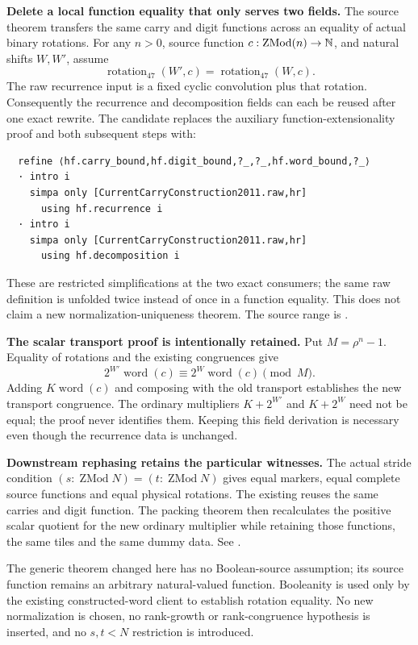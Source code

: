\textbf{Delete a local function equality that only serves two fields.} The source theorem  transfers the same carry and digit functions across an equality of actual binary rotations. For any $n>0$, source function $c:\operatorname{ZMod}(n)\to\mathbb N$, and natural shifts $W,W'$, assume
\[
 \operatorname{rotation}_{47}(W',c)=\operatorname{rotation}_{47}(W,c).
\]
The raw recurrence input is a fixed cyclic convolution plus that rotation. Consequently the recurrence and decomposition fields can each be reused after one exact rewrite. The candidate replaces the auxiliary function-extensionality proof and both subsequent  steps with:
\begin{lstlisting}
  refine ⟨hf.carry_bound,hf.digit_bound,?_,?_,hf.word_bound,?_⟩
  · intro i
    simpa only [CurrentCarryConstruction2011.raw,hr]
      using hf.recurrence i
  · intro i
    simpa only [CurrentCarryConstruction2011.raw,hr]
      using hf.decomposition i
\end{lstlisting}
These are restricted simplifications at the two exact consumers; the same raw definition is unfolded twice instead of once in a function equality. This does not claim a new normalization-uniqueness theorem. The source range is .

\textbf{The scalar transport proof is intentionally retained.} Put $M=\rho^n-1$. Equality of rotations and the existing  congruences give
\[
 2^{W'}\operatorname{word}(c)\equiv2^W\operatorname{word}(c)\pmod M.
\]
Adding $K\operatorname{word}(c)$ and composing with the old transport establishes the new transport congruence. The ordinary multipliers $K+2^{W'}$ and $K+2^W$ need not be equal; the proof never identifies them. Keeping this field derivation is necessary even though the recurrence data is unchanged.

\textbf{Downstream rephasing retains the particular witnesses.} The actual stride condition $(s:\operatorname{ZMod}N)=(t:\operatorname{ZMod}N)$ gives equal markers, equal complete source functions and equal physical rotations. The existing  reuses the same carries and digit function. The packing theorem then recalculates the positive scalar quotient for the new ordinary multiplier while retaining those functions, the same tiles and the same dummy data. See .

The generic theorem changed here has no Boolean-source assumption; its source function remains an arbitrary natural-valued function. Booleanity is used only by the existing constructed-word client to establish rotation equality. No new normalization is chosen, no rank-growth or rank-congruence hypothesis is inserted, and no $s,t<N$ restriction is introduced.

